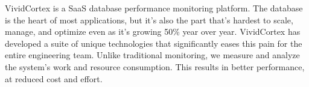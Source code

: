 \documentclass{vivid_layout}
\begin{document}
\newpage
\begin{about}	%
VividCortex is a SaaS database performance monitoring platform. The database is the heart of most applications, but it's also the part that's hardest to scale, manage, and optimize even as it's growing 50\% year over year. VividCortex has developed a suite of unique technologies that significantly eases this pain for the entire engineering team. Unlike traditional monitoring, we measure
and analyze the system's work and resource consumption. This results in better performance, at reduced cost and effort.
\end{about}
\makeresources	%
\end{document}
